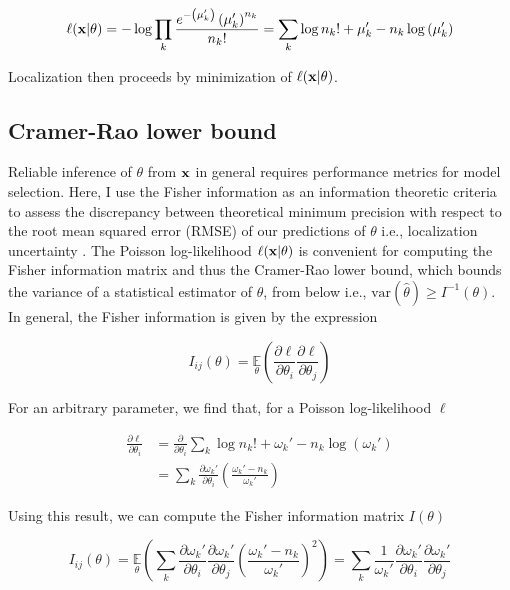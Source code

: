 \begin{equation}
\ell(\bold{x}\lvert\theta) = -\log \prod_{k} \frac{e^{-\left(\mu_{k}'\right)}\left(\mu_{k}'\right)^{n_{k}}}{n_{k}!} = \sum_{k}  \log n_{k}! + \mu_{k}' - n_{k}\log\left(\mu_{k}'\right)
\end{equation}

Localization then proceeds by minimization of $\ell(\bold{x}\lvert\theta)$. 

\subsection{Cramer-Rao lower bound}

Reliable inference of $\theta$ from $\bold{x}$ in general requires performance metrics for model selection. Here, I use the Fisher information as an information theoretic criteria to assess the discrepancy between theoretical minimum precision with respect to the root mean squared error (RMSE) of our predictions of $\theta$ i.e., localization uncertainty \parencite{Chao2016}. The Poisson log-likelihood $\ell(\bold{x}\lvert\theta)$ is convenient for computing the Fisher information matrix \parencite{Smith2010} and thus the Cramer-Rao lower bound, which bounds the variance of a statistical estimator of $\theta$, from below i.e., $\mathrm{var}(\hat{\theta}) \geq I^{-1}(\theta)$. In general, the Fisher information is given by the expression

\begin{equation}
I_{ij}(\theta) = \underset{\theta}{\mathbb{E}}\left(\frac{\partial \ell}{\partial\theta_{i}}\frac{\partial\ell}{\partial\theta_{j}}\right) 
\end{equation}

For an arbitrary parameter, we find that, for a Poisson log-likelihood $\ell$

\begin{align*}
\frac{\partial \ell}{\partial \theta_{i}} &= \frac{\partial}{\partial \theta_{i}} \sum_{k}  \log n_{k}! + \omega_{k}' - n_{k}\log\left(\omega_{k}'\right)\\
&= \sum_{k} \frac{\partial \omega_{k}'}{\partial\theta_{i}} \left(\frac{\omega_{k}'-n_{k}}{\omega_{k}'}\right)
\end{align*}

Using this result, we can compute the Fisher information matrix $I(\theta)$

\begin{equation*}
I_{ij}(\theta) = \underset{\theta}{\mathbb{E}}\left(\sum_{k}\frac{\partial \omega_{k}'}{\partial\theta_{i}}\frac{\partial \omega_{k}'}{\partial\theta_{j}} \left(\frac{\omega_{k}'-n_{k}}{\omega_{k}'}\right)^{2}\right) = \sum_{k}\frac{1}{\omega_{k}'}\frac{\partial \omega_{k}'}{\partial\theta_{i}}\frac{\partial \omega_{k}'}{\partial\theta_{j}}
\end{equation*}

